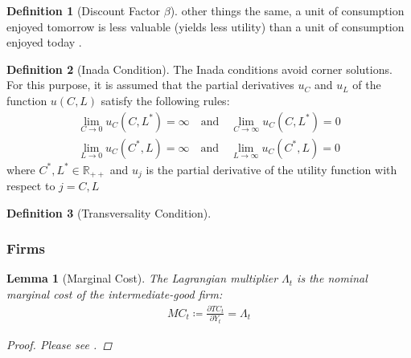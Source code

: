 \documentclass[
	12pt,
	]{article}
\numberwithin{equation}{section}
\theoremstyle{definition}
\newtheorem{definition}{Definition}[section]
\theoremstyle{plain}
\theoremstyle{plain}
\newtheorem{lemma}{Lemma}[section]
\theoremstyle{plain}
\begin{document}
\begin{definition}[Discount Factor $\beta$]
	other things the same, a unit of consumption enjoyed tomorrow is less valuable (yields less utility) than a unit of consumption enjoyed today \cite[Lecture 2, p.1]{solis-garcia_ucb_2022}.
\end{definition}


\begin{definition}[Inada Condition] \label{def:Inada Condition}
	The Inada conditions \cite{inada_two-sector_1963} avoid corner solutions. For this purpose, it is assumed that the partial derivatives $u_C$ and $u_L$ of the function $u(C, L)$ satisfy the following rules:
	\begin{align}
		\lim_{C\to 0} u_C(C,L^\ast) = \infty \quad \text{and} \quad
		\lim_{C\to \infty} u_C(C,L^\ast) = 0 \\
		\lim_{L\to 0} u_C(C^\ast,L) = \infty \quad \text{and} \quad
		\lim_{L\to \infty} u_C(C^\ast,L) = 0 \nonumber
	\end{align}
	where $C^\ast,L^\ast \in \mathbb{R}_{++}$ and $u_j$ is the partial derivative of the utility function with respect to $j=C,L$ \cite[Lecture 1, p.2]{solis-garcia_ucb_2022}
\end{definition}


\begin{definition}[Transversality Condition]
	\cite[Lecture 4, p.4]{solis-garcia_ucb_2022}
\end{definition}


\subsubsection{Firms}


\begin{lemma}[Marginal Cost]\label{lemma:marginal-cost}
	The Lagrangian multiplier $\Lambda_t$ is the nominal marginal cost of the intermediate-good firm:
	\begin{align}
		MC_t \coloneq \frac{\partial TC_t}{\partial Y_t} = \Lambda_t
	\end{align}
	
	\begin{proof}
		Please see \textcite[p.449]{simon_mathematics_1994}.
	\end{proof}
	
\end{lemma}
\end{document}
